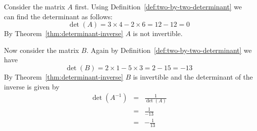 \begin{solution}
  Consider the matrix $A$ first. Using
  Definition~\ref{def:two-by-two-determinant} we can find the
  determinant as follows:
  \begin{equation*}
    \det(A) = 3 \times 4 - 2 \times 6 = 12 - 12 = 0
  \end{equation*}
  By Theorem~\ref{thm:determinant-inverse} $A$ is not invertible.

  Now consider the matrix $B$. Again by
  Definition~\ref{def:two-by-two-determinant} we have
  \begin{equation*}
    \det(B) = 2 \times 1 - 5 \times 3 = 2 - 15 = -13
  \end{equation*}
  By Theorem~\ref{thm:determinant-inverse} $B$ is invertible and the
  determinant of the inverse is given by
  \begin{eqnarray*}
    \det(A^{-1}) &=& \frac{1}{\det(A)} \\
                  &=& \frac{1}{-13} \\
                  &=& -\frac{1}{13}
  \end{eqnarray*}
\end{solution}
